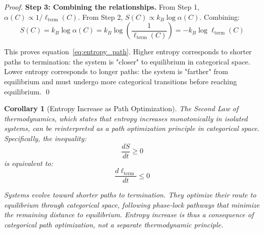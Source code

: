 \documentclass[12pt,a4paper]{article}
\newtheorem{corollary}[theorem]{Corollary}
\theoremstyle{definition}
\theoremstyle{remark}
\begin{document}
\begin{proof}
\textbf{Step 3: Combining the relationships.}
From Step 1, $\alpha(C) \propto 1/\ell_{\text{term}}(C)$. From Step 2, $S(C) \propto k_B \log \alpha(C)$. Combining:
\begin{equation}
S(C) = k_B \log \alpha(C) = k_B \log \left(\frac{1}{\ell_{\text{term}}(C)}\right) = -k_B \log \ell_{\text{term}}(C)
\end{equation}

This proves equation~\eqref{eq:entropy_path}. Higher entropy corresponds to shorter paths to termination: the system is "closer" to equilibrium in categorical space. Lower entropy corresponds to longer paths: the system is "farther" from equilibrium and must undergo more categorical transitions before reaching equilibrium. \qed
\end{proof}

\begin{corollary}[Entropy Increase as Path Optimization]
\label{cor:path_optimisation}
The Second Law of thermodynamics, which states that entropy increases monotonically in isolated systems, can be reinterpreted as a path optimization principle in categorical space. Specifically, the inequality:
\begin{equation}
\frac{dS}{dt} \geq 0
\end{equation}
is equivalent to:
\begin{equation}
\frac{d\ell_{\text{term}}}{dt} \leq 0
\end{equation}

Systems evolve toward shorter paths to termination. They optimize their route to equilibrium through categorical space, following phase-lock pathways that minimize the remaining distance to equilibrium. Entropy increase is thus a consequence of categorical path optimization, not a separate thermodynamic principle.
\end{corollary}
\end{document}
